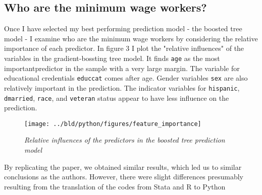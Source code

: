 \documentclass[11pt, a4paper, leqno]{article}
\begin{document}
\subsection{Who are the minimum wage workers?}

Once I have selected my best performing prediction model - the boosted tree model -
I examine who are the minimum wage workers by considering  
the relative importance of each predictor. In ﬁgure 3 
I plot the "relative inﬂuences" of the variables in the gradient-bossting tree model. 
It ﬁnds \texttt{age} as the most importantpredictor in the sample with a very large margin.
The variable for educational credentials \texttt{educcat} comes after age. 
Gender variables \texttt{sex} are also relatively important
in the prediction. The indicator variables for \texttt{hispanic}, \texttt{dmarried}, \texttt{race}, and
\texttt{veteran} status appear to have less inﬂuence on the prediction.

\begin{figure}[H]

    \centering
    \texttt{[image: ../bld/python/figures/feature\_importance]}

    \caption{\emph{Relative influences of the predictors in the boosted tree prediction model}}
    \label{fig:feature_importance}

\end{figure}

By replicating the paper, we obtained similar results, 
which led us to similar conclusions as the authors. 
However, there were slight differences presumably resulting 
from the translation of the codes from Stata and R to Python


\printbibliography
{}


\end{document}
